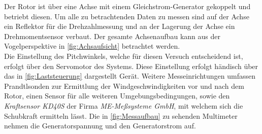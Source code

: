Der Rotor ist über eine Achse mit einem Gleichstrom-Generator gekoppelt und betriebt diesen.
Um alle zu betrachtenden Daten zu messen sind auf der Achse ein Reflektor für die Drehzahlmessung und an der Lagerung der Achse ein Drehmomentsensor verbaut.
Der gesamte Achsenaufbau kann aus der Vogelperspektive in \autoref{fig:Achsaufsicht} betrachtet werden.\\
Die Einstellung des Pitchwinkels, welche für diesen Versuch entscheidend ist, erfolgt über den Servomotor des Systems. Diese Einstellung erfolgt händisch über das in \autoref{fig:Laststeuerung} dargestellt Gerät.
Weitere Messeinrichtungen umfassen Prandtlsonden zur Ermittlung der Windgeschwindigkeiten vor und nach dem Rotor, einen Sensor für alle weiteren Umgebungsbedingungen, sowie den \textit{Kraftsensor KD40S} der Firma \textit{ME-Meßsysteme GmbH}, mit welchem sich die Schubkraft ermitteln lässt.
Die in \autoref{fig:Messaufbau} zu sehenden Multimeter nehmen die Generatorspannung und den Generatorstrom auf.
    
